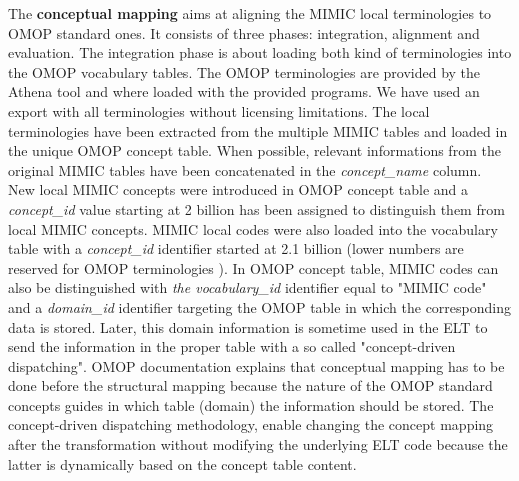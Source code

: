 The \textbf{conceptual mapping} aims at aligning the MIMIC local terminologies
to OMOP standard ones. It consists of three phases: integration, alignment and
evaluation.
The integration phase is about loading both kind of terminologies into the OMOP
vocabulary tables.
The OMOP terminologies are provided by the Athena tool \cite{ohdsi-athena} and
where loaded with the provided programs. We have used an export with all
terminologies without licensing limitations.
The local terminologies have been extracted from the multiple MIMIC tables and
loaded in the unique OMOP concept table. When possible, relevant informations
from the original MIMIC tables have been concatenated in the
\textit{concept\_name} column. 
New local MIMIC concepts were introduced in OMOP concept table and a \textit{concept\_id} value 
starting at 2 billion has been assigned to distinguish them from local MIMIC concepts.  
MIMIC local codes were also loaded into the vocabulary table with a \textit{concept\_id} 
identifier started at 2.1 billion (lower numbers are reserved for OMOP terminologies
\cite{omop-documentation}). 
In OMOP concept table, MIMIC codes can also be distinguished with \textit{the vocabulary\_id}
identifier equal to "MIMIC code" and a \textit{domain\_id} identifier targeting
the OMOP table in which the corresponding data is stored. Later, this domain
information is sometime used in the ELT to send the information in the proper
table with a so called "concept-driven dispatching". 
OMOP documentation explains that conceptual mapping has to be done before the
structural mapping because the nature of the OMOP standard concepts guides in
which table (domain) the information should be stored. The concept-driven
dispatching methodology, enable changing the concept mapping after the
transformation without modifying the underlying ELT code because the latter is
dynamically based on the concept table content.

